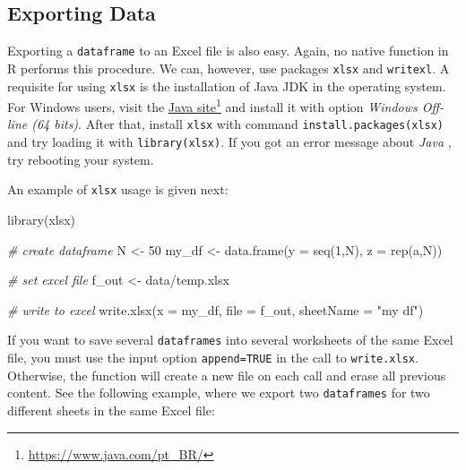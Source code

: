 \documentclass[
  12pt,
]{book}
\newenvironment{Shaded}{\begin{snugshade}}{\end{snugshade}}
\newcommand{\AttributeTok}[1]{\textcolor[rgb]{0.61,0.61,0.61}{#1}}
\newcommand{\CommentTok}[1]{\textcolor[rgb]{0.37,0.37,0.37}{\textit{#1}}}
\newcommand{\DecValTok}[1]{\textcolor[rgb]{0.06,0.06,0.06}{#1}}
\newcommand{\FunctionTok}[1]{\textcolor[rgb]{0,0,0}{#1}}
\newcommand{\NormalTok}[1]{#1}
\newcommand{\OtherTok}[1]{\textcolor[rgb]{0.37,0.37,0.37}{#1}}
\newcommand{\StringTok}[1]{\textcolor[rgb]{0.5,0.5,0.5}{#1}}
\begin{document}
\hypertarget{exporting-data-1}{%
\subsection{Exporting Data}\label{exporting-data-1}}

Exporting a \texttt{dataframe} to an Excel file is also easy. Again, no native function in R performs this procedure. We can, however, use packages \texttt{xlsx} and \texttt{writexl}. A requisite for using \texttt{xlsx} is the installation of Java JDK in the operating system. For Windows users, visit the \href{https://www.java.com/pt_BR/}{Java site}\footnote{\url{https://www.java.com/pt_BR/}} and install it with option \emph{Windows Off-line (64 bits)}. After that, install \texttt{xlsx} with command \texttt{install.packages(\textquotesingle{}xlsx\textquotesingle{})} and try loading it with \texttt{library(xlsx)}. If you got an error message about \emph{Java} , try rebooting your system.

An example of \texttt{xlsx} usage is given next: 

\begin{Shaded}
\begin{Highlighting}[]
\FunctionTok{library}\NormalTok{(xlsx)}

\CommentTok{\# create dataframe}
\NormalTok{N }\OtherTok{\textless{}{-}} \DecValTok{50}
\NormalTok{my\_df }\OtherTok{\textless{}{-}} \FunctionTok{data.frame}\NormalTok{(}\AttributeTok{y =} \FunctionTok{seq}\NormalTok{(}\DecValTok{1}\NormalTok{,N), }\AttributeTok{z =} \FunctionTok{rep}\NormalTok{(}\StringTok{\textquotesingle{}a\textquotesingle{}}\NormalTok{,N))}

\CommentTok{\# set excel file}
\NormalTok{f\_out }\OtherTok{\textless{}{-}} \StringTok{\textquotesingle{}data/temp.xlsx\textquotesingle{}}

\CommentTok{\# write to excel}
\FunctionTok{write.xlsx}\NormalTok{(}\AttributeTok{x =}\NormalTok{ my\_df, }\AttributeTok{file =}\NormalTok{ f\_out, }\AttributeTok{sheetName =} \StringTok{"my df"}\NormalTok{)}
\end{Highlighting}
\end{Shaded}

If you want to save several \texttt{dataframes} into several worksheets of the same Excel file, you must use the input option \texttt{append=TRUE} in the call to \texttt{write.xlsx}. Otherwise, the function will create a new file on each call and erase all previous content. See the following example, where we export two \texttt{dataframes} for two different sheets in the same Excel file: 
\end{document}
